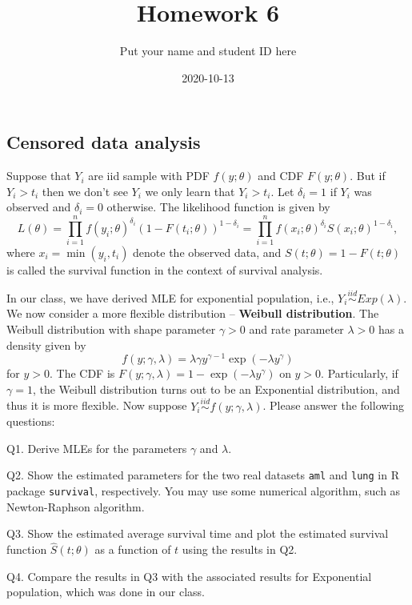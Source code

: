 \documentclass[]{article}
\title{Homework 6}
\author{Put your name and student ID here}
\date{2020-10-13}
\begin{document}
\maketitle

\hypertarget{censored-data-analysis}{%
\subsection{Censored data analysis}\label{censored-data-analysis}}

Suppose that \(Y_i\) are iid sample with PDF \(f(y;\theta)\) and CDF
\(F(y;\theta)\). But if \(Y_i> t_i\) then we don't see \(Y_i\) we only
learn that \(Y_i> t_i\). Let \(\delta_i=1\) if \(Y_i\) was observed and
\(\delta_i=0\) otherwise. The likelihood function is given by
\[L(\theta)=\prod_{i=1}^n f(y_i;\theta)^{\delta_i}(1-F(t_i;\theta))^{1-\delta_i}=\prod_{i=1}^n f(x_i;\theta)^{\delta_i}S(x_i;\theta)^{1-\delta_i},\]
where \(x_i = \min(y_i,t_i)\) denote the observed data, and
\(S(t;\theta)=1-F(t;\theta)\) is called the survival function in the
context of survival analysis.

In our class, we have derived MLE for exponential population, i.e.,
\(Y_i\stackrel{iid}\sim Exp(\lambda)\). We now consider a more flexible
distribution -- \textbf{Weibull distribution}. The Weibull distribution
with shape parameter \(\gamma>0\) and rate parameter \(\lambda>0\) has a
density given by
\[f(y;\gamma,\lambda) = \lambda\gamma y^{\gamma-1} \exp(- \lambda y^\gamma)\]
for \(y > 0\). The CDF is
\(F(y;\gamma,\lambda) = 1 - \exp(- \lambda y^\gamma)\) on \(y > 0\).
Particularly, if \(\gamma=1\), the Weibull distribution turns out to be
an Exponential distribution, and thus it is more flexible. Now suppose
\(Y_i\stackrel{iid}\sim f(y;\gamma,\lambda)\). Please answer the
following questions:

Q1. Derive MLEs for the parameters \(\gamma\) and \(\lambda\).

Q2. Show the estimated parameters for the two real datasets \texttt{aml}
and \texttt{lung} in R package \texttt{survival}, respectively. You may
use some numerical algorithm, such as Newton-Raphson algorithm.

Q3. Show the estimated average survival time and plot the estimated
survival function \(\hat S(t;\theta)\) as a function of \(t\) using the
results in Q2.

Q4. Compare the results in Q3 with the associated results for
Exponential population, which was done in our class.
\end{document}
